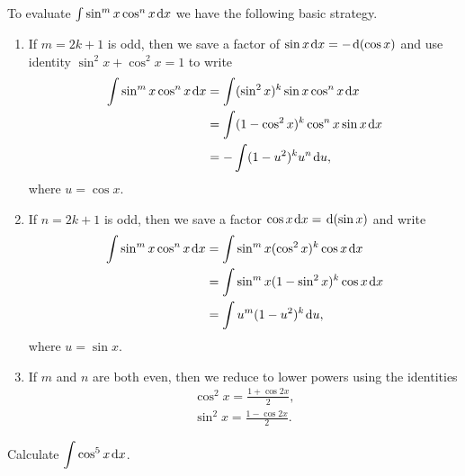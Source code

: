 \setcounter{chapter}{8}
\setcounter{section}{3}
\setcounter{theorem}{0}
\setcounter{equation}{0}


\begin{remark}
To evaluate $\int \sin^m x\cos^n x\mkern 2mu \mathrm{d} x$ we have the following basic strategy.
\begin{enumerate}
\item If $m=2k+1$ is odd, then we save a factor of $\sin x\mkern 2mu \mathrm{d} x = -\mkern 2mu \mathrm{d}(\cos x)$ and use identity $\sin^2 x + \cos^2 x = 1$ to write
\begin{equation*}
\begin{split}
\int \sin^m x \cos^n x\mkern 2mu \mathrm{d} x &= \int (\sin^2 x)^k\sin x\cos^n x\mkern 2mu \mathrm{d} x \\
&= \int (1-\cos^2 x)^k\cos^n x\sin x\mkern 2mu \mathrm{d} x\\
& = -\int (1-u^2)^ku^n\mkern 2mu \mathrm{d} u,
\end{split}
\end{equation*}
where $u=\cos x$.
\item If $n=2k+1$ is odd, then we save a factor $\cos x\mkern 2mu \mathrm{d} x = \mkern 2mu \mathrm{d}(\sin x)$ and write
\begin{equation*}
\begin{split}
\int \sin^m x \cos^n x\mkern 2mu \mathrm{d} x &= \int\sin^m x(\cos^2 x)^k\cos x\mkern 2mu \mathrm{d} x \\
&= \int\sin^m x(1-\sin^2 x)^k\cos x\mkern 2mu \mathrm{d} x \\
&= \int u^m(1-u^2)^k\mkern 2mu \mathrm{d} u,
\end{split}
\end{equation*}
where $u=\sin x$.
\item If $m$ and $n$ are both even, then we reduce to lower powers using the identities
\begin{align*}
\cos^2 x = \frac{1+\cos 2x}{2},\\
\sin^2 x = \frac{1-\cos 2x}{2}.
\end{align*}
\end{enumerate}
\end{remark}

\begin{example}
Calculate $\displaystyle\int\cos^5 x\mkern 2mu \mathrm{d} x$.
\end{example}
\ifdefined\SOLUTION
{}
\fi
\vfill

